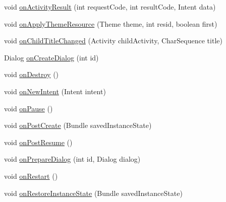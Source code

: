 \begin{DoxyCompactItemize}
\item 
void \hyperlink{classorg_1_1qtproject_1_1qt5_1_1android_1_1bindings_1_1_qt_activity_a4e9a7c6b28384e4d5f713462207ffc41}{on\-Activity\-Result} (int request\-Code, int result\-Code, Intent data)
\item 
void \hyperlink{classorg_1_1qtproject_1_1qt5_1_1android_1_1bindings_1_1_qt_activity_acd279279e5ad448d802fa31b64a30aef}{on\-Apply\-Theme\-Resource} (Theme theme, int resid, boolean first)
\item 
void \hyperlink{classorg_1_1qtproject_1_1qt5_1_1android_1_1bindings_1_1_qt_activity_ac300f488c368a77573a3ecbf90f88b3c}{on\-Child\-Title\-Changed} (Activity child\-Activity, Char\-Sequence title)
\item 
Dialog \hyperlink{classorg_1_1qtproject_1_1qt5_1_1android_1_1bindings_1_1_qt_activity_a94b7cad79823109fd5ce75385766144b}{on\-Create\-Dialog} (int id)
\item 
void \hyperlink{classorg_1_1qtproject_1_1qt5_1_1android_1_1bindings_1_1_qt_activity_a30832553da49ca0dea222e062e21710c}{on\-Destroy} ()
\item 
void \hyperlink{classorg_1_1qtproject_1_1qt5_1_1android_1_1bindings_1_1_qt_activity_a995502b7cf803efcecc91d345b030404}{on\-New\-Intent} (Intent intent)
\item 
void \hyperlink{classorg_1_1qtproject_1_1qt5_1_1android_1_1bindings_1_1_qt_activity_a54af4563a2a1f3ea73187c2e9b9b042c}{on\-Pause} ()
\item 
void \hyperlink{classorg_1_1qtproject_1_1qt5_1_1android_1_1bindings_1_1_qt_activity_a1a206c815af224d5bf06e5c921f4fdd4}{on\-Post\-Create} (Bundle saved\-Instance\-State)
\item 
void \hyperlink{classorg_1_1qtproject_1_1qt5_1_1android_1_1bindings_1_1_qt_activity_af23189d66db86a4a4356af8481450fa1}{on\-Post\-Resume} ()
\item 
void \hyperlink{classorg_1_1qtproject_1_1qt5_1_1android_1_1bindings_1_1_qt_activity_a7c23883f7117af2b20250150e032935d}{on\-Prepare\-Dialog} (int id, Dialog dialog)
\item 
void \hyperlink{classorg_1_1qtproject_1_1qt5_1_1android_1_1bindings_1_1_qt_activity_a05a1cabee75d99161959de7575052b73}{on\-Restart} ()
\item 
void \hyperlink{classorg_1_1qtproject_1_1qt5_1_1android_1_1bindings_1_1_qt_activity_a0dd64ece074eb6909bb384a63105083b}{on\-Restore\-Instance\-State} (Bundle saved\-Instance\-State)
\item 

\end{DoxyCompactItemize}
